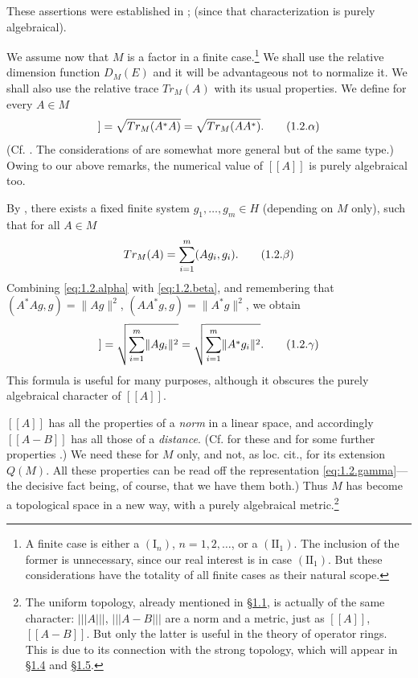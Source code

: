 \documentclass[b5paper,twoside]{article}
\makeatletter
\newcommand{\MvNSetCurrentLabel}[2]{%
  \edef\@currentlabel{#1}%
  \edef\@currentlabelname{#2}%
}
\newcommand{\MvNTargetLabel}[3]{%
  \phantomsection
  \begingroup
    \MvNSetCurrentLabel{#2}{#3}%
    \label{#1}%
  \endgroup
}
\newcommand{\FootnoteTarget}[1]{%
  \MvNTargetLabel{#1}{\thefootnote}{Footnote \thefootnote}}
\newcommand{\secref}[2]{\hyperref[#1]{\mbox{\S#2}}}
\theoremstyle{mvnplain}
\newcommand{\M}{\mathbf M}
\newcommand{\Hilbert}{\mathfrak H}
\newcommand{\Metric}[1]{\left[\!\left[#1\right]\!\right]}
\newcommand{\OpNorm}[1]{\left\lvert\left\lvert\left\lvert#1\right\rvert\right\rvert\right\rvert}
\def\M{M}%
\def\Hilbert{H}%
\def\Metric#1{[[#1]]}%
\def\operatorname#1{#1}%
\def\mathfrak#1{#1}%
\makeatother
\begin{document}
These assertions were established in \cite[p.~145, Lemma~5.2.1;
p.~173, Theorem~IX]{ref5}; \cite[p.~219, Property~IV]{ref6} (since that
characterization is purely algebraical).

We assume now that $\M$ is a factor in a finite case.\footnote{\FootnoteTarget{fn:1}A finite case is
either a $(\mathrm I_n)$, $n=1,2,\ldots$, or a $(\mathrm{II}_1)$.  The inclusion
of the former is unnecessary, since our real interest is in case
$(\mathrm{II}_1)$.  But these considerations have the totality of all finite
cases as their natural scope.}  We shall use the relative dimension function
$D_{\M}(E)$ and it will be advantageous not to normalize it.  We shall also use
the relative trace $\operatorname{Tr}_{\M}(A)$ with its usual properties.  We
define for every $A\in\M$
\begin{equation}
  \Metric{A}
  =\sqrt{\operatorname{Tr}_{\M}(A^*A)}
  =\sqrt{\operatorname{Tr}_{\M}(AA^*)}.
  \tag{1.2.\ensuremath{\alpha}}\label{eq:1.2.alpha}
\end{equation}
(Cf. \cite[p.~241, Lemma~4.3.2]{ref6}.  The considerations of
\cite[p.~102, Definition~1.3.1 and Theorem~II]{ref8} are somewhat more general
but of the same type.)  Owing to our above remarks, the numerical value of
$\Metric{A}$ is purely algebraical too.

By \cite[p.~235, Theorem~III]{ref6}, there exists a fixed finite system
$g_1,\ldots,g_m\in\Hilbert$ (depending on $\M$ only), such that for all
$A\in\M$
\begin{equation}
  \operatorname{Tr}_{\M}(A)=\sum_{i=1}^{m}(Ag_i,g_i).
  \tag{1.2.\ensuremath{\beta}}\label{eq:1.2.beta}
\end{equation}
Combining \eqref{eq:1.2.alpha} with \eqref{eq:1.2.beta}, and remembering that
$(A^*Ag,g)=\lVert Ag\rVert^2$, $(AA^*g,g)=\lVert A^*g\rVert^2$, we obtain
\begin{equation}
  \Metric{A}
  =\sqrt{\sum_{i=1}^{m}\lVert Ag_i\rVert^2}
  =\sqrt{\sum_{i=1}^{m}\lVert A^*g_i\rVert^2}.
  \tag{1.2.\ensuremath{\gamma}}\label{eq:1.2.gamma}
\end{equation}
This formula is useful for many purposes, although it obscures the purely
algebraical character of $\Metric{A}$.

$\Metric{A}$ has all the properties of a \emph{norm} in a linear space, and
accordingly $\Metric{A-B}$ has all those of a \emph{distance}.  (Cf. for these
and for some further properties \cite[p.~242, Property~II\textsuperscript{o}]{ref6}.)
We need these for $\M$ only, and not, as loc. cit., for its extension $Q(\M)$.
All these properties can be read off the representation
\eqref{eq:1.2.gamma}---the decisive fact being, of course, that we have them
both.)  Thus $\M$ has become a topological space in a new way, with a purely
algebraical metric.\footnote{The uniform topology, already mentioned in
\secref{sec:1.1}{1.1}, is actually of the same character: $\OpNorm{A}$,
$\OpNorm{A-B}$ are a norm and a metric, just as $\Metric{A}$,
$\Metric{A-B}$.  But only the latter is useful in the theory of operator rings.
This is due to its connection with the strong topology, which will appear in
\secref{sec:1.4}{1.4} and \secref{sec:1.5}{1.5}.}
\end{document}
